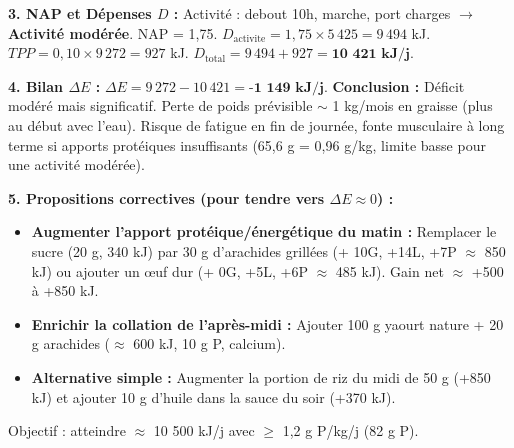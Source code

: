 \documentclass[11pt]{article}
\begin{document}
\begin{corrige}
\textbf{3. NAP et Dépenses $D$ :}
Activité : debout 10h, marche, port charges $\rightarrow$ \textbf{Activité modérée}. NAP = 1,75.
$D_{\text{activite}} = 1,75 \times 5\,425 = 9\,494$ kJ.
$TPP = 0,10 \times 9\,272 = 927$ kJ.
$D_{\text{total}} = 9\,494 + 927 = \textbf{10 421 kJ/j}$.

\textbf{4. Bilan $\Delta E$ :}
$\Delta E = 9\,272 - 10\,421 = \textbf{-1 149 kJ/j}$.
\textbf{Conclusion :} Déficit modéré mais significatif. Perte de poids prévisible $\sim$ 1 kg/mois en graisse (plus au début avec l'eau). Risque de fatigue en fin de journée, fonte musculaire à long terme si apports protéiques insuffisants (65,6 g = 0,96 g/kg, limite basse pour une activité modérée).

\textbf{5. Propositions correctives (pour tendre vers $\Delta E \approx 0$) :}
\begin{itemize}
    \item \textbf{Augmenter l'apport protéique/énergétique du matin :} Remplacer le sucre (20 g, 340 kJ) par 30 g d'arachides grillées (+ 10G, +14L, +7P $\approx$ 850 kJ) ou ajouter un œuf dur (+ 0G, +5L, +6P $\approx$ 485 kJ). Gain net $\approx$ +500 à +850 kJ.
    \item \textbf{Enrichir la collation de l'après-midi :} Ajouter 100 g yaourt nature + 20 g arachides ($\approx$ 600 kJ, 10 g P, calcium).
    \item \textbf{Alternative simple :} Augmenter la portion de riz du midi de 50 g (+850 kJ) et ajouter 10 g d'huile dans la sauce du soir (+370 kJ).
\end{itemize}
Objectif : atteindre $\approx$ 10 500 kJ/j avec $\ge$ 1,2 g P/kg/j (82 g P).
\end{corrige}
\end{document}

